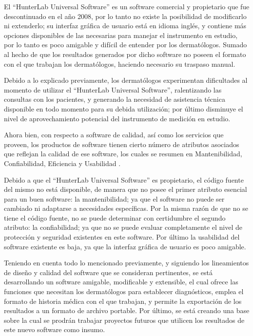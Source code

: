 \documentclass[conference]{IEEEtran}
\begin{document}
El ``HunterLab Universal Software'' es un software comercial y propietario que fue descontinuado en el a\~{n}o 2008, por lo tanto no existe la posibilidad de modificarlo ni extenderlo; su interfaz gr\'{a}fica de usuario est\'{a} en idioma ingl\'{e}s, y contiene m\'{a}s opciones disponibles de las necesarias para manejar el instrumento en estudio, por lo tanto es poco amigable y dif\'{i}cil de entender por los dermat\'{o}logos. Sumado al hecho de que los resultados generados por dicho software no poseen el formato con el que trabajan los dermat\'{o}logos, haciendo necesario su traspaso manual. 

Debido a lo explicado previamente, los dermat\'{o}logos experimentan dificultades al momento de utilizar el ``HunterLab Universal Software'', ralentizando las consultas con los pacientes, y generando la necesidad de asistencia t\'{e}cnica disponible en todo momento para su debida utilizaci\'{o}n; por \'{u}ltimo disminuye el nivel de aprovechamiento potencial del instrumento de medici\'{o}n en estudio.

Ahora bien, con respecto a software de calidad, as\'{i} como los servicios que proveen, los productos de software tienen cierto n\'{u}mero de atributos asociados que reflejan la calidad de ese software, los cuales se resumen en Mantenibilidad, Confiabilidad, Eficiencia y Usabilidad \cite{Sommerville}.

Debido a que el ``HunterLab Universal Software'' es propietario, el c\'{o}digo fuente del mismo no est\'{a} disponible, de manera que no posee el primer atributo esencial para un buen software: la mantenibilidad; ya que el software no puede ser cambiado ni adaptarse a necesidades espec\'{i}ficas. Por la misma raz\'{o}n de que no se tiene el c\'{o}digo fuente, no se puede determinar con certidumbre el segundo atributo: la confiabilidad; ya que no se puede evaluar completamente el nivel de protecci\'{o}n y seguridad existentes en este software. Por \'{u}ltimo la usabilidad del software existente es baja, ya que la interfaz gr\'{a}fica de usuario es poco amigable.

Teniendo en cuenta todo lo mencionado previamente, y siguiendo los lineamientos de dise\~{n}o y calidad del software que se consideran pertinentes, se est\'{a} desarrollando un software amigable, modificable y extensible, el cual ofrece las funciones que necesitan los dermat\'{o}logos para establecer diagn\'{o}sticos, emplea el formato de historia m\'{e}dica con el que trabajan, y permite la exportaci\'{o}n de los resultados a un formato de archivo portable. Por \'{u}ltimo, se est\'{a} creando una base sobre la cual se prodr\'{a}n trabajar proyectos futuros que utilicen los resultados de este nuevo software como insumo.
\end{document}
